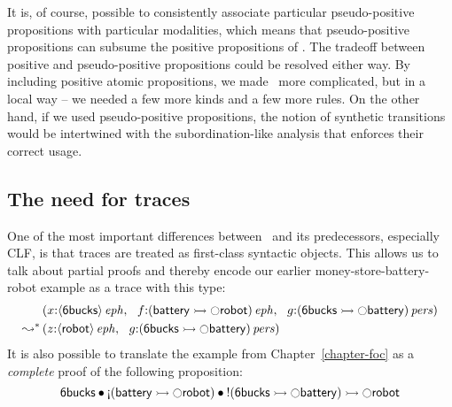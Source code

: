 It is, of course, possible to consistently associate particular
pseudo-positive propositions with particular modalities, which means
that pseudo-positive propositions can subsume the positive
propositions of \sls. The tradeoff between positive and
pseudo-positive propositions could be resolved either way. By
including positive atomic propositions, we made \sls~more complicated,
but in a local way -- we needed a few more kinds and a few more
rules. On the other hand, if we used pseudo-positive propositions, the
notion of synthetic transitions would be intertwined with the
subordination-like analysis that enforces their correct usage.

\subsection{The need for traces}
\label{sec:whytraces}

One of the most important differences between \sls~and its
predecessors, especially CLF, is that traces are treated as
first-class syntactic objects. This allows us to talk about 
partial proofs and thereby encode our earlier 
money-store-battery-robot example as a trace with this type:
\begin{align*}
& \left(
 x{:}{\langle {\sf 6bucks} \rangle}\,{{\it eph}}, ~~
 f{:}{({\sf battery} \rightarrowtail {\ocircle}{\sf robot})}\,{{\it eph}}, ~~
 g{:}{({\sf 6bucks} \rightarrowtail {\ocircle}{\sf battery})}\,{{\it pers}}
\right)
\\
\leadsto^* &
\left(
 z{:}{\langle {\sf robot} \rangle}\,{{\it eph}}, ~~
 g{:}{({\sf 6bucks} \rightarrowtail {\ocircle}{\sf battery})}\,{{\it pers}}
\right)
\end{align*}
It is also possible to translate the example from Chapter~\ref{chapter-foc}
as a {\it complete} proof of the following proposition:
\[
  {\sf 6bucks} 
      \fuse {\gnab}({\sf battery} \lefti {\ocircle}{\sf robot})
      \fuse {!}({\sf 6bucks} \lefti {\ocircle}{\sf battery})
     \lefti
     {\ocircle}{\sf robot}
\]

